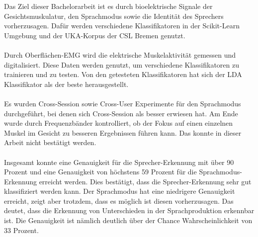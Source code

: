 
\begin{abstractgerman}
Das Ziel dieser Bachelorarbeit ist es durch bioelektrische Signale der Gesichtsmuskulatur, den Sprachmodus sowie die Identität des Sprechers vorherzusagen. Dafür werden verschiedene Klassifikatoren in der Scikit-Learn Umgebung und der UKA-Korpus der CSL Bremen genutzt.

\paragraph{}
Durch Oberflächen-EMG wird die elektrische Muskelaktivität
gemessen und digitalisiert. Diese Daten werden genutzt, um verschiedene Klassifikatoren zu trainieren und zu testen. Von den getesteten Klassifikatoren hat sich der LDA Klassifikator als der beste herausgestellt.

\paragraph{}
Es wurden Cross-Session sowie Cross-User Experimente für den Sprachmodus durchgeführt, bei denen sich Cross-Session als besser erwiesen hat. Am Ende wurde durch Frequenzbänder kontrolliert, ob der Fokus auf einen einzelnen Muskel im Gesicht zu besseren Ergebnissen führen kann. Das konnte in dieser Arbeit nicht bestätigt werden.

\paragraph{}
Insgesamt konnte eine Genauigkeit für die Sprecher-Erkennung mit über 90 Prozent und eine Genauigkeit von höchstens 59 Prozent für die Sprachmodus-Erkennung erreicht werden. Dies bestätigt, dass die Sprecher-Erkennung sehr gut klassifiziert werden kann. Der Sprachmodus hat eine niedrigere Genauigkeit erreicht, zeigt aber trotzdem, dass es möglich ist diesen vorherzusagen. Das deutet, dass die Erkennung von Unterschieden in der Sprachproduktion erkennbar ist.
Die Genauigkeit ist nämlich deutlich über der Chance Wahrscheinlichkeit von 33 Prozent.


\clearpage
\end{abstractgerman}

